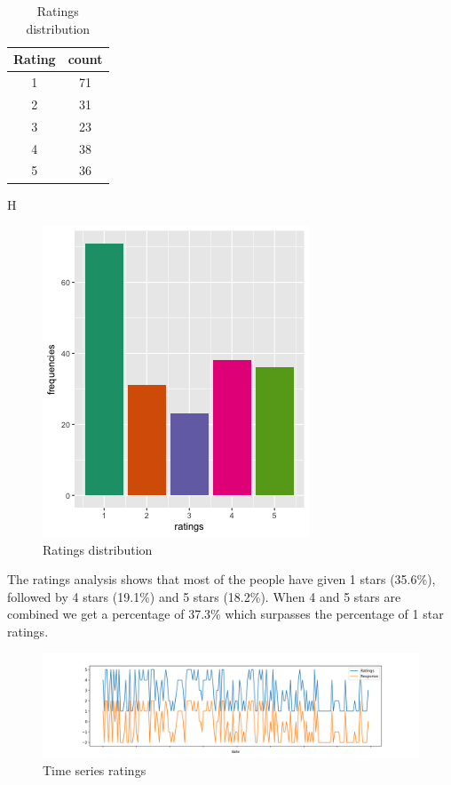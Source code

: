 \documentclass[a4paper, 12pt]{extarticle}
\begin{document}
{\begin{table}[H]
\centering
\begin{tabular}{|c|c|}
\hline
Rating & count \\
\hline
1 & 71 \\
\hline
2 & 31 \\
\hline
3 & 23 \\
\hline
4 & 38 \\
\hline
5 & 36 \\
\hline
\end{tabular}
\caption{Ratings distribution}
\end{table}{H}
\begin{figure}[H]
\centering
\includegraphics[scale=1]{ratings_distribution.png}
\caption{Ratings distribution}
\end{figure}

The ratings analysis shows that most of the people have given 1 stars (35.6\%), followed by 4 stars (19.1\%) and 5 stars (18.2\%). When 4 and 5 stars are combined we get a percentage of 37.3\% which surpasses the percentage of 1 star ratings. 
\begin{figure}[H]
\centering
\includegraphics[scale=0.5]{rat_res.png}
\caption{Time series ratings}
\label{fig:rat_res}
\end{figure}

}
\end{document}
